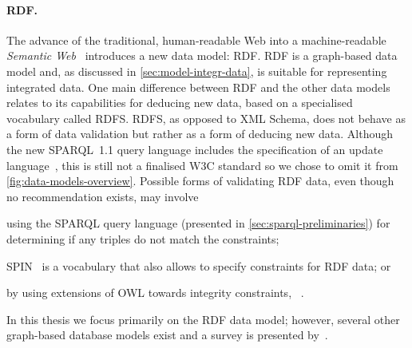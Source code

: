 \paragraph*{RDF.}
%
The advance of the traditional, human-readable Web into a machine-readable \emph{Semantic
  Web}~\cite{LeeHendlerLassila:2001aa} introduces a new data model: \ac{RDF}.
%
\ac{RDF} is a graph-based data model and, as discussed in \cref{sec:model-integr-data}, is suitable for representing
integrated data.
%
One main difference between \ac{RDF} and the other data models relates to its capabilities for deducing new data, based
on a specialised vocabulary called \acl{RDFS}.  \ac{RDFS}, as opposed to XML Schema, does not behave as a form of data
validation but rather as a form of deducing new data.
%
Although the new SPARQL~1.1 query language includes the specification of an update
language~\cite{GearonPassantPolleres:2012aa}, this is still not a finalised \ac{W3C} standard so we chose to omit it
from \cref{fig:data-models-overview}.
%
Possible forms of validating \ac{RDF} data, even though no recommendation exists, may involve
\begin{enumerate*}[label=(\roman*)]
\item using the SPARQL query language (presented in \cref{sec:sparql-preliminaries}) for determining if any triples
  do not match the constraints;
\item SPIN~\cite{KnublauchHendlerIdehen:2011aa} is a vocabulary that also allows to specify constraints for \ac{RDF}
  data; or
\item by using extensions of \ac{OWL} towards integrity constraints, \eg~\citet{TaoSirinBao:2010aa}.
\end{enumerate*}
%
In this thesis we focus primarily on the \ac{RDF} data model; however, several other graph-based database models exist
and a survey is presented by~\citet{AnglesGutierrez:2008ab}.
%



